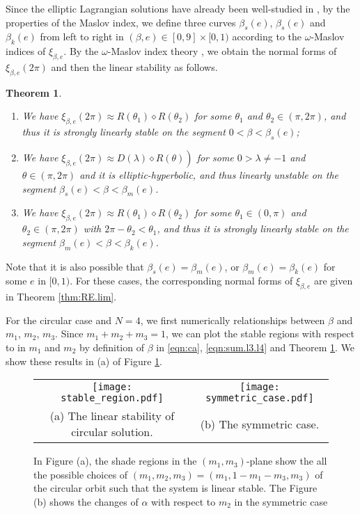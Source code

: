 \documentclass[11pt]{article}
\newtheorem{theorem}[lemma]{Theorem}
\def\lb{\label}
\def\bb{{\beta}}
\def\om{{\omega}}
\begin{document}
Since the elliptic Lagrangian solutions have already been well-studied in \cite{HLS},
by the properties of the Maslov index, we define three curves $\bb_s(e)$, $\bb_s(e)$ and $\bb_k(e)$ from left to right in $(\bb, e)\in [0,9]\times [0, 1)$ according to the $\omega$-Maslov indices of $\xi_{\bb,e}$. 
By the $\om$-Maslov index theory \cite{Lon4}, we obtain the normal forms of $\xi_{\bb,e}(2\pi)$ and then the linear stability as follows.
\begin{theorem}\lb{thm:RE.norm.form}
	\begin{enumerate}[label = (\roman*)]
		\item 
		We have $\xi_{\beta, e}(2 \pi) \approx R\left(\theta_{1}\right) \diamond R\left(\theta_{2}\right)$ for some $\theta_{1}$ and $\theta_{2} \in(\pi, 2 \pi)$, and thus it is strongly linearly stable on the segment $0<\beta<\beta_s(e)$; 
		\item We have $\left.\xi_{\beta, e}(2 \pi) \approx D(\lambda) \diamond R(\theta)\right)$ for some $0>\lambda \neq-1$ and $\theta \in(\pi, 2 \pi)$ and it is elliptic-hyperbolic, and thus linearly unstable on the segment $\beta_{s}(e)<\beta<\beta_{m}(e)$.
		\item  We have $\xi_{\beta, e}(2 \pi) \approx R\left(\theta_{1}\right) \diamond R\left(\theta_{2}\right)$ for some $\theta_{1} \in(0, \pi)$ and $\theta_{2} \in(\pi, 2 \pi)$ with $2 \pi-\theta_{2}<\theta_{1}$, and thus it is strongly linearly stable on the segment $\beta_{m}(e)<\beta<\beta_k(e)$.
	\end{enumerate}
\end{theorem}
  

Note that it is also possible that $\bb_s(e) = \bb_m(e)$, or $ \bb_{m}(e) = \bb_k(e)$  for some $e$ in $[0,1)$. For these cases, the corresponding normal forms of $\xi_{\bb,e}$ are given in Theorem \ref{thm:RE.lim}.

For the circular case
and $N=4$, we first numerically relationships between $\bb$ and $m_1$, $m_2$, $m_3$. Since $m_1 + m_2 + m_3 = 1$, we can plot the stable regions with respect to in $m_1$ and $m_2$ by definition of $\bb$ in \eqref{eqn:ca}, \eqref{eqn:sum.l3.l4} and Theorem \ref{thm:RE.norm.form}. We show these results in (a) of Figure \ref{fig:1}.
\begin{figure}[htbp]
	\centering
  \begin{tabular}{cc}
    \texttt{[image: stable\_region.pdf]} &
		\texttt{[image: symmetric\_case.pdf]}  \\
		\footnotesize{(a) The linear stability of circular solution.}  & 
		\footnotesize{(b) The symmetric case.} 
	\end{tabular}
	\caption{\footnotesize{In Figure (a), the shade regions in the $(m_1,m_3)$-plane show the all the possible choices of $(m_1, m_2, m_3) = (m_1, 1- m_1 - m_3, m_3)$ of the circular orbit such that the system is linear stable. The Figure (b) shows the changes of $\alpha$ with respect to $m_2$ in the symmetric case}}
	\label{fig:1}
\end{figure}
\end{document}
